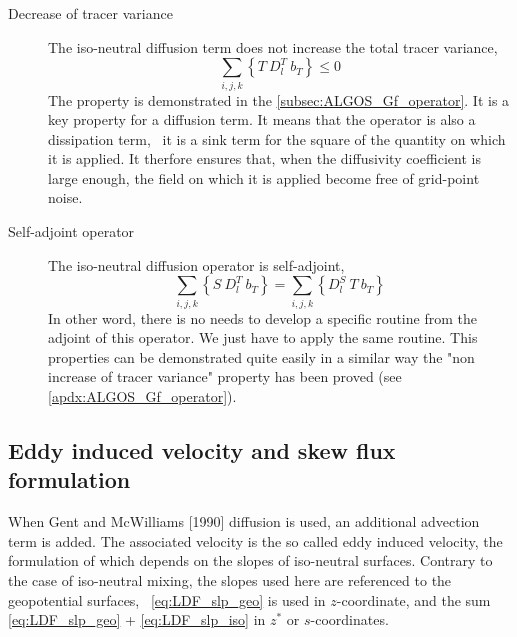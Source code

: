\documentclass[../main/NEMO_manual]{subfiles}
\begin{document}
\begin{description}
\item [Decrease of tracer variance] The iso-neutral diffusion term does not increase the total tracer variance, \ie
  \[
    \sum_{i,j,k} \left\{ T \ D_l^T \ b_T \right\} \leq 0
  \]
The property is demonstrated in the \autoref{subsec:ALGOS_Gf_operator}.
It is a key property for a diffusion term.
It means that the operator is also a dissipation term,
\ie\ it is a sink term for the square of the quantity on which it is applied.
It therfore ensures that, when the diffusivity coefficient is large enough,
the field on which it is applied become free of grid-point noise.
\item [Self-adjoint operator] The iso-neutral diffusion operator is self-adjoint, \ie
  \[
    \sum_{i,j,k} \left\{ S \ D_l^T \ b_T \right\} = \sum_{i,j,k} \left\{ D_l^S \ T \ b_T \right\}
  \]
In other word, there is no needs to develop a specific routine from the adjoint of this operator.
We just have to apply the same routine.
This properties can be demonstrated quite easily in a similar way the "non increase of tracer variance" property
has been proved (see \autoref{apdx:ALGOS_Gf_operator}).
\end{description}

\subsection{Eddy induced velocity and skew flux formulation}

When Gent and McWilliams [1990] diffusion is used,
an additional advection term is added.
The associated velocity is the so called eddy induced velocity,
the formulation of which depends on the slopes of iso-neutral surfaces.
Contrary to the case of iso-neutral mixing, the slopes used here are referenced to the geopotential surfaces,
\ie\ \autoref{eq:LDF_slp_geo} is used in $z$-coordinate,
and the sum \autoref{eq:LDF_slp_geo} + \autoref{eq:LDF_slp_iso} in $z^*$ or $s$-coordinates.
\end{document}
